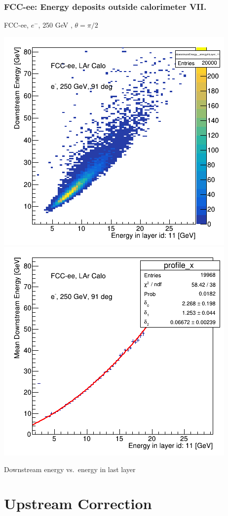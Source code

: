 \documentclass{beamer}
\newcommand{\redtext}[1]{%
  \textcolor{myRed}{#1}
}
\begin{document}
\begin{frame}
  \frametitle{FCC-ee: Energy deposits outside calorimeter VII.}

  \centering
  FCC-ee, $e^{-}$, \redtext{250 GeV}, $\theta = \pi/2$ \\[1.5ex]
  \begin{adjustwidth}{-9mm}{-9mm}
    \includegraphics[width=0.49\linewidth]{figures/12layers/hist_downstream_vs_layer_11_91deg_250GeV.png}
    \includegraphics[width=0.49\linewidth]{figures/12layers/profile_downstream_vs_layer_11_91deg_250GeV.png}
  \end{adjustwidth}
  \redtext{Downstream} energy vs.\ energy in last layer
\end{frame}


\section{Upstream Correction}
\end{document}
